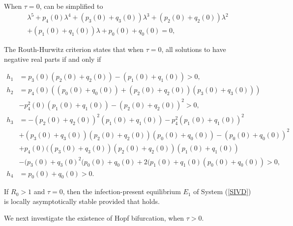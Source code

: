 \documentclass{CMHPhD-SIVD}
\begin{document}


When $\tau=0$,  can be simplified to
\begin{equation}\label{10}
   \begin{array}{ll}
   \lambda^5+ p_4(0)\lambda^4+(p_3(0)+q_3(0) )\lambda^3+(p_2(0) + q_2(0)) \lambda^2\\+(p_1(0) + q_1(0)) \lambda+p_0(0) +q_0(0)=0,
   \end{array}
\end{equation}

The Routh-Hurwitz criterion states that when $\tau=0$, all solutions to  have negative real parts if and only if

\begin{equation}\label{11}
\begin{aligned}
h_{1}&=p_3(0)(p_2(0) + q_2(0))-(p_1(0) + q_1(0))>0,\\
h_{2}&=p_4(0)((p_0(0) + q_0(0))+(p_2(0) + q_2(0))(p_3(0) + q_3(0)))\nonumber \\
&-p_4^2(0)(p_1(0) +q_1(0))-(p_2(0) + q_2(0))^2>0,\\
h_{3}&=-(p_2(0)+q_2(0))^2(p_1(0)+q_1(0))-p_4^2(p_1(0)+q_1(0))^2\nonumber \\
&+(p_3(0)+q_3(0))(p_2(0)+q_2(0))(p_0(0)+q_0(0))-(p_0(0)+q_0(0))^2\nonumber \\
&+p_4(0)((p_3(0)+q_3(0))(p_2(0)+q_2(0))(p_1(0)+q_1(0))\nonumber \\
&-(p_3(0)+q_3(0)^2(p_0(0)+q_0(0)+2(p_1(0)+q_1(0)(p_0(0)+q_0(0))>0,\\
h_4&=p_0(0)+q_0(0)>0.
\end{aligned}
\end{equation}

 If $R_0 > 1$ and $\tau = 0$, then the infection-present equilibrium $E_1$ of System (\ref{SIVD}) is locally asymptotically stable provided that  holds.

We next investigate the existence of Hopf bifurcation, when $\tau>0$.
\end{document}
